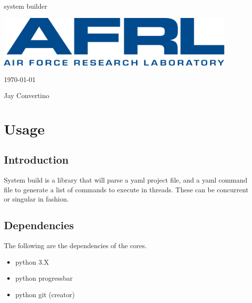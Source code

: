 \begin{titlepage}
  \begin{center}

  {\Huge system builder}

  \vspace{25mm}

  \includegraphics[width=0.90\textwidth,height=\textheight,keepaspectratio]{img/AFRL.png}

  \vspace{25mm}

  \today

  \vspace{15mm}

  {\Large Jay Convertino}

  \end{center}
\end{titlepage}

\tableofcontents

\newpage

\section{Usage}

\subsection{Introduction}

\par
System build is a library that will parse a yaml project file, and a yaml command
file to generate a list of commands to execute in threads. These can be concurrent
or singular in fashion.

\subsection{Dependencies}

\par
The following are the dependencies of the cores.

\begin{itemize}
  \item python 3.X
  \item python progressbar
  \item python git (creator)
\end{itemize}


